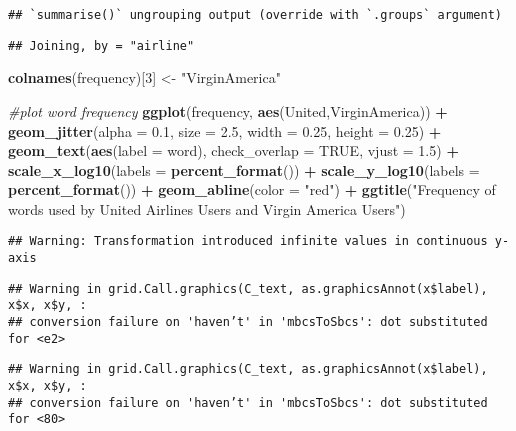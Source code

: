 \documentclass[
]{article}
\newenvironment{Shaded}{\begin{snugshade}}{\end{snugshade}}
\newcommand{\CommentTok}[1]{\textcolor[rgb]{0.56,0.35,0.01}{\textit{#1}}}
\newcommand{\DataTypeTok}[1]{\textcolor[rgb]{0.13,0.29,0.53}{#1}}
\newcommand{\DecValTok}[1]{\textcolor[rgb]{0.00,0.00,0.81}{#1}}
\newcommand{\FloatTok}[1]{\textcolor[rgb]{0.00,0.00,0.81}{#1}}
\newcommand{\KeywordTok}[1]{\textcolor[rgb]{0.13,0.29,0.53}{\textbf{#1}}}
\newcommand{\NormalTok}[1]{#1}
\newcommand{\OperatorTok}[1]{\textcolor[rgb]{0.81,0.36,0.00}{\textbf{#1}}}
\newcommand{\OtherTok}[1]{\textcolor[rgb]{0.56,0.35,0.01}{#1}}
\newcommand{\StringTok}[1]{\textcolor[rgb]{0.31,0.60,0.02}{#1}}
\begin{document}
\begin{verbatim}
## `summarise()` ungrouping output (override with `.groups` argument)
\end{verbatim}

\begin{verbatim}
## Joining, by = "airline"
\end{verbatim}

\begin{Shaded}
\begin{Highlighting}[]
\KeywordTok{colnames}\NormalTok{(frequency)[}\DecValTok{3}\NormalTok{] <-}\StringTok{ "VirginAmerica"} 

\CommentTok{#plot word frequency}
\KeywordTok{ggplot}\NormalTok{(frequency, }\KeywordTok{aes}\NormalTok{(United,VirginAmerica)) }\OperatorTok{+}
\StringTok{  }\KeywordTok{geom_jitter}\NormalTok{(}\DataTypeTok{alpha =} \FloatTok{0.1}\NormalTok{, }\DataTypeTok{size =} \FloatTok{2.5}\NormalTok{, }\DataTypeTok{width =} \FloatTok{0.25}\NormalTok{, }\DataTypeTok{height =} \FloatTok{0.25}\NormalTok{) }\OperatorTok{+}
\StringTok{  }\KeywordTok{geom_text}\NormalTok{(}\KeywordTok{aes}\NormalTok{(}\DataTypeTok{label =}\NormalTok{ word), }\DataTypeTok{check_overlap =} \OtherTok{TRUE}\NormalTok{, }\DataTypeTok{vjust =} \FloatTok{1.5}\NormalTok{) }\OperatorTok{+}
\StringTok{  }\KeywordTok{scale_x_log10}\NormalTok{(}\DataTypeTok{labels =} \KeywordTok{percent_format}\NormalTok{()) }\OperatorTok{+}
\StringTok{  }\KeywordTok{scale_y_log10}\NormalTok{(}\DataTypeTok{labels =} \KeywordTok{percent_format}\NormalTok{()) }\OperatorTok{+}
\StringTok{  }\KeywordTok{geom_abline}\NormalTok{(}\DataTypeTok{color =} \StringTok{"red"}\NormalTok{) }\OperatorTok{+}\StringTok{ }
\StringTok{  }\KeywordTok{ggtitle}\NormalTok{(}\StringTok{"Frequency of words used by United Airlines Users and Virgin America Users"}\NormalTok{)}
\end{Highlighting}
\end{Shaded}

\begin{verbatim}
## Warning: Transformation introduced infinite values in continuous y-axis
\end{verbatim}

\begin{verbatim}
## Warning in grid.Call.graphics(C_text, as.graphicsAnnot(x$label), x$x, x$y, :
## conversion failure on 'haven’t' in 'mbcsToSbcs': dot substituted for <e2>
\end{verbatim}

\begin{verbatim}
## Warning in grid.Call.graphics(C_text, as.graphicsAnnot(x$label), x$x, x$y, :
## conversion failure on 'haven’t' in 'mbcsToSbcs': dot substituted for <80>
\end{verbatim}
\end{document}
